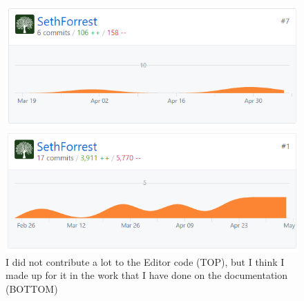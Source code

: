\documentclass[letterpaper,12pt]{texMemo}
\begin{document}
\begin{figure}[h]
  \centering
  \includegraphics[width=\linewidth]{grid_commits}
  \caption{
    I did not contribute a lot to the Editor code (TOP), but I think I made up for it in the work that I have done on the documentation (BOTTOM) \newline
  }
  
  \includegraphics[width=\linewidth]{design_commits}
\end{figure}
\end{document}
